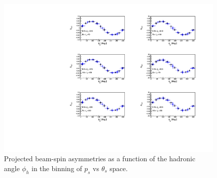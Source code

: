 \begin{figure}[htb]
  \centering
    \includegraphics[width=1.1\textwidth,clip]{figs_epngamma/pdf/epngamma_BSA_incoherent_Phi.pdf}
  \caption{Projected beam-spin asymmetries as a function of the hadronic angle 
   $\phi_h$ in the binning of $p_s$ vs $\theta_s$ space.
   \label{fig:alu_semi}}
\end{figure}



